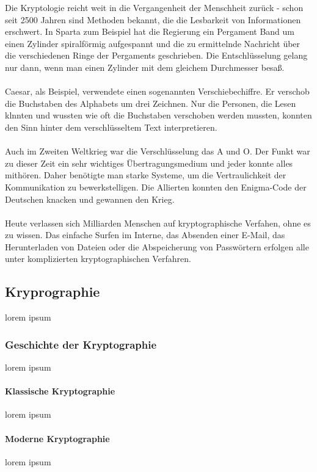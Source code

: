\documentclass[12pt,a4paper]{report}
\begin{document}
Die Kryptologie reicht weit in die Vergangenheit der Menschheit zurück - schon seit 2500 Jahren sind Methoden bekannt, die die Lesbarkeit von Informationen erschwert. In Sparta zum Beispiel hat die Regierung ein Pergament Band um einen Zylinder spiralförmig aufgespannt und die zu ermittelnde Nachricht über die verschiedenen Ringe der Pergaments geschrieben. Die Entschlüsselung gelang nur dann, wenn man einen Zylinder mit dem gleichem Durchmesser besaß.\\\\

Caesar, als Beispiel, verwendete einen sogenannten Verschiebechiffre. Er verschob die Buchstaben des Alphabets um drei Zeichnen. Nur die Personen, die Lesen klnnten und wussten wie oft die Buchstaben verschoben werden mussten, konnten den Sinn hinter dem verschlüsseltem Text interpretieren.\\\\

Auch im Zweiten Weltkrieg war die Verschlüsselung das A und O. Der Funkt war zu dieser Zeit ein sehr wichtiges Übertragungsmedium und jeder konnte alles mithören. Daher benötigte man starke Systeme, um die Vertraulichkeit der Kommunikation zu bewerkstelligen. Die Allierten konnten den Enigma-Code der Deutschen knacken und gewannen den Krieg.\\\\

Heute verlassen sich Milliarden Menschen auf kryptographische Verfahen, ohne es zu wissen. Das einfache Surfen im Interne, das Absenden einer E-Mail, das Herunterladen von Dateien oder die Abspeicherung von Passwörtern erfolgen alle unter komplizierten kryptographischen Verfahren.

\subsection{Kryprographie}
lorem ipsum
\subsubsection{Geschichte der Kryptographie}
lorem ipsum
\paragraph{Klassische Kryptographie}
lorem ipsum
\paragraph{Moderne Kryptographie}
lorem ipsum
\end{document}
